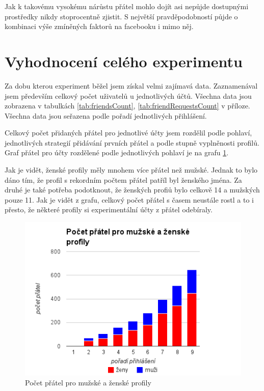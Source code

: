 \documentclass[thesis=M,czech]{FITthesis}[2013/05/10]
\begin{document}
Jak k takovému vysokému nárůstu přátel mohlo dojít asi nepůjde dostupnými prostředky nikdy stoprocentně zjistit. S největší pravděpodobností půjde o kombinaci výše zmíněných faktorů na facebooku i mimo něj.

\section{Vyhodnocení celého experimentu}

Za dobu kterou experiment běžel jsem získal velmi zajímavá data. Zaznamenával jsem především celkový počet uživatelů u jednotlivých účtů. Všechna data jsou zobrazena v tabulkách \ref{tab:friendsCount}, \ref{tab:friendRequestsCount} v příloze. Všechna data jsou seřazena podle pořadí jednotlivých přihlášení.

Celkový počet přidaných přátel pro jednotlivé účty jsem rozdělil podle pohlaví, jednotlivých strategií přidávání prvních přátel a podle stupně vyplněnosti profilů. Graf přátel pro účty rozdělené podle jednotlivých pohlaví je na grafu \ref{fig:gender}. 

Jak je vidět, ženské profily měly mnohem více přátel než mužské. Jednak to bylo dáno tím, že profil s rekordním počtem přátel patříl byl ženského jména. Za druhé je také potřeba podotknout, že ženských profiů bylo celkově 14 a mužských pouze 11. Jak je vidět z grafu, celkový počet přátel s časem neustále rostl a to i přesto, že některé profily si experimentální účty z přátel odebíraly. 

\begin{figure}[h]
\begin{center}
\includegraphics[width=5in]{figures/gender.png}
\caption{Počet přátel pro mužské a ženské profily}
\label{fig:gender}
\end{center}
\end{figure}
\end{document}
